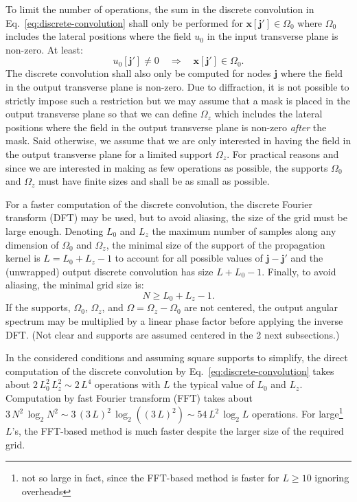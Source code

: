 \documentclass[a4paper]{article}
\newcommand{\oops}[1]{{\color{purple}#1}}
\newcommand{\V}[1]{\boldsymbol{#1}}
\newcommand*{\Set}[1]{\mathbb{#1}}
\begin{document}
To limit the number of operations, the sum in the discrete convolution in
Eq.~\eqref{eq:discrete-convolution} shall only be performed for
$\V{x}[\V{j}'] \in Ω_{0}$ where $Ω_{0}$ includes the lateral positions where
the field $u_{0}$ in the input transverse plane is non-zero. At least:
\begin{equation}
  \label{eq:input-field-support}
  u_{0}[\V{j}']
  \not= 0
  \quad\Longrightarrow\quad
  \V{x}[\V{j}'] \in Ω_{0}.
\end{equation}
The discrete convolution shall also only be computed for nodes $\V{j}$ where
the field in the output transverse plane is non-zero. Due to diffraction, it is
not possible to strictly impose such a restriction but we may assume that a
mask is placed in the output transverse plane so that we can define $Ω_{z}$
which includes the lateral positions where the field in the output transverse
plane is non-zero \emph{after} the mask. Said otherwise, we assume that we are
only interested in having the field in the output transverse plane for a
limited support $Ω_{z}$. For practical reasons and since we are interested in
making as few operations as possible, the supports $Ω_{0}$ and $Ω_{z}$ must
have finite sizes and shall be as small as possible.

For a faster computation of the discrete convolution, the discrete Fourier
transform (DFT) may be used, but to avoid aliasing, the size of the grid must
be large enough. Denoting $L_{0}$ and $L_{z}$ the maximum number of samples
along any dimension of $Ω_{0}$ and $Ω_{z}$, the minimal size of the support of
the propagation kernel is $L = L_{0} + L_{z} - 1$ to account for all possible
values of $\V{j} - \V{j}'$ and the (unwrapped) output discrete convolution has
size $L + L_{0} - 1$. Finally, to avoid aliasing, the minimal grid size is:
\begin{equation}
  \label{eq:convolution-grid-size}
  N ≥ L_{0} + L_{z} - 1.
\end{equation}
If the supports, $Ω_{0}$, $Ω_{z}$, and $Ω = Ω_{z} - Ω_{0}$ are not centered,
the output angular spectrum may be multiplied by a linear phase factor before
applying the inverse DFT. \oops{(Not clear and supports are assumed centered in
  the 2 next subsections.)}

In the considered conditions and assuming square supports to simplify, the
direct computation of the discrete convolution by
Eq.~\eqref{eq:discrete-convolution} takes about
$2\,L_{0}^{2}\,L_{z}^{2} \sim 2\,L^{4}$ operations with $L$ the typical
value of $L_{0}$ and $L_{z}$. Computation by fast Fourier transform (FFT) takes
about $3\,N^{2}\,\log_{2}N^{2} \sim 3\,(3\,L)^{2}\,\log_{2}((3\,L)^{2}) \sim 54\,L^{2}\,\log_{2}L$
operations. For large\footnote{not so large in fact, since the FFT-based method
  is faster for $L ≥ 10$ ignoring overheads} $L$'s, the FFT-based method is
much faster despite the larger size of the required grid.
\end{document}
